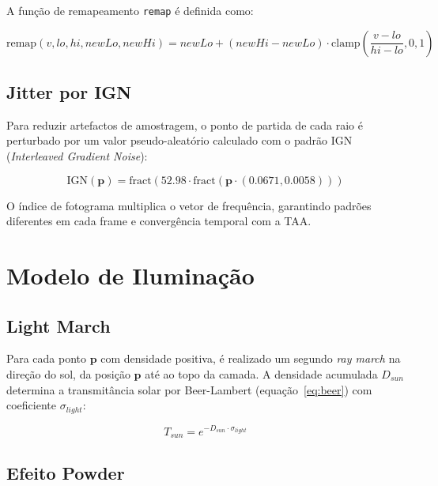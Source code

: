 A função de remapeamento \texttt{remap} é definida como:

\begin{equation}
\text{remap}(v, lo, hi, newLo, newHi) = newLo + (newHi - newLo) \cdot \text{clamp}\!\left(\frac{v - lo}{hi - lo}, 0, 1\right)
\label{eq:remap}
\end{equation}

\subsection{Jitter por IGN}
\label{chap4:subsec:ign}

Para reduzir artefactos de amostragem, o ponto de partida de cada raio é perturbado por um valor pseudo-aleatório calculado com o padrão \ac{IGN} (\emph{Interleaved Gradient Noise}):

\begin{equation}
\text{IGN}(\mathbf{p}) = \text{fract}\!\left(52.98 \cdot \text{fract}\!\left(\mathbf{p} \cdot (0.0671, 0.0058)\right)\right)
\label{eq:ign}
\end{equation}

O índice de fotograma multiplica o vetor de frequência, garantindo padrões diferentes em cada frame e convergência temporal com a \ac{TAA}.

\section{Modelo de Iluminação}
\label{chap4:sec:ilum}

\subsection{Light March}
\label{chap4:subsec:lightmarch}

Para cada ponto $\mathbf{p}$ com densidade positiva, é realizado um segundo \emph{ray march} na direção do sol, da posição $\mathbf{p}$ até ao topo da camada. A densidade acumulada $D_{sun}$ determina a transmitância solar por Beer-Lambert (equação~\ref{eq:beer}) com coeficiente $\sigma_{light}$:

\begin{equation}
T_{sun} = e^{-D_{sun} \cdot \sigma_{light}}
\label{eq:tsun}
\end{equation}

\subsection{Efeito Powder}
\label{chap4:subsec:powderimpl}


